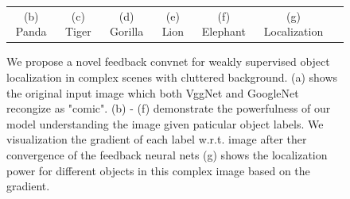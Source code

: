 \begin{figure}
\begin{center}
\begin{tabular}{ccccccc}
{\small (b) Panda} &
{\small (c) Tiger} &
{\small (d) Gorilla} &
{\small (e) Lion} &
{\small (f) Elephant} &
{\small (g) Localization}
\end{tabular}
\caption{We propose a novel feedback convnet for weakly supervised object localization in complex scenes with cluttered background. (a) shows the original input image which both VggNet and GoogleNet recongize as "comic". (b) - (f) demonstrate the powerfulness of our model understanding the image given paticular object labels. We visualization the gradient of each label w.r.t. image after ther convergence of the feedback neural nets (g) shows the localization power for different objects in this complex image based on the gradient.}
\label{fig:splash}
\end{center}
\end{figure}

